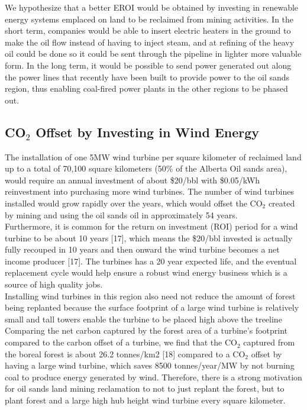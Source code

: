 \documentclass[12pt]{article}
\begin{document}
We hypothesize that a better EROI would be obtained by investing in renewable energy systems emplaced on land to be reclaimed from mining activities. In the short term, companies would be able to insert electric heaters in the ground to make the oil flow instead of having to inject steam, and at refining of the heavy oil could be done so it could be sent through the pipeline in lighter more valuable form. In the long term, it would be possible to send power generated out along the power lines that recently have been built to provide power to the oil sands region, thus enabling coal-fired power plants in the other regions to be phased out.


\subsection{CO$_2$ Offset by Investing in Wind Energy}

The installation of one 5MW wind turbine per square kilometer of reclaimed land up to a total of 70,100 square kilometers (50\% of the Alberta Oil sands area), would require an annual investment of about \$20/bbl with \$0.05/kWh reinvestment into purchasing more wind turbines.  The number of wind turbines installed would grow rapidly over the years, which would offset the CO$_2$ created by mining and using the oil sands oil in approximately 54 years. \\
 
Furthermore, it is common for the return on investment (ROI) period for a wind turbine to be about 10 years [17], which means the \$20/bbl invested is actually fully recouped in 10 years and then onward the wind turbine becomes a net income producer [17].  The turbines has a 20 year expected life, and the eventual replacement cycle would help ensure a robust wind energy business which is a source of high quality jobs. \\

Installing wind turbines in this region also need not reduce the amount of forest being replanted because the surface footprint of a large wind turbine is relatively small and tall towers enable the turbine to be placed high above the treeline Comparing the net carbon captured by the forest area of a turbine’s footprint compared to the carbon offset of a turbine, we find that the CO$_2$ captured from the boreal forest is about 26.2 tonnes/km2 [18] compared to a CO$_2$ offset by having a large wind turbine, which saves 8500 tonnes/year/MW by not burning coal to produce energy generated by wind. Therefore, there is a strong motivation for oil sands land mining reclamation to not to just replant the forest, but to plant forest and a large high hub height wind turbine every square kilometer. \\
  
\end{document}
